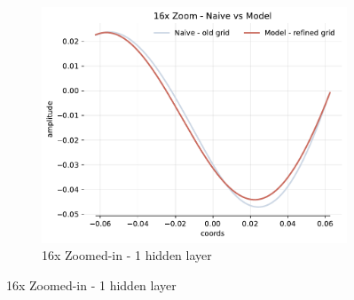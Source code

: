 \begin{figure}[!h]
\begin{subfigure}[b]{0.32\textwidth}
        \centering
        \includegraphics[width=\textwidth]{img/ch3/16x-8hf-1hl-2w-sub6.pdf}
        \caption{16x Zoomed-in - 1 hidden layer}
    \end{subfigure}


\end{figure}
